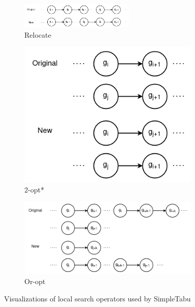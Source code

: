 \documentclass[12pt]{report}
\begin{document}
\begin{figure}[ht]
	\centering
	\begin{subfigure}[b]{\linewidth}
		\centering
		\includegraphics[width=0.6\textwidth]{images/lsops-relocate.png}
		\caption{Relocate}
	\end{subfigure}
	\begin{subfigure}[b]{0.3\linewidth}
		\centering
		\includegraphics[width=0.95\textwidth]{images/lsops-2-opt.png}
		\caption{2-opt*}
	\end{subfigure}
	\begin{subfigure}[b]{0.6\linewidth}
		\centering
		\includegraphics[width=0.95\textwidth]{images/lsops-or-opt.png}
		\caption{Or-opt}
	\end{subfigure}
	\caption{Visualizations of local search operators used by SimpleTabu}
	\label{fig:operators}
\end{figure}
\end{document}
